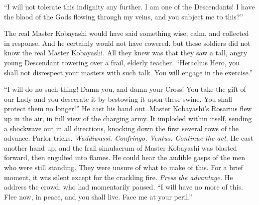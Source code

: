 “I will not tolerate this indignity any further. I am one of the Descendants! I have the blood of the Gods flowing through my veins, and you subject me to this?”

The real Master Kobayashi would have said something wise, calm, and collected in response. And he certainly would not have cowered. but these soldiers did not know the real Master Kobayashi. All they knew was that they saw a tall, angry young Descendant towering over a frail, elderly teacher.
\SmallVSpace
“Heraclius Hero, you shall not disrespect your masters with such talk. You will engage in the exercise.”

“I will do no such thing! Damn you, and damn your Cross! You take the gift of our Lady and you desecrate it by bestowing it upon these swine. You shall protect them no longer!”
\SmallVSpace
He cast his hand out. Master Kobayashi’s Rosarius flew up in the air, in full view of the charging army. It imploded within itself, sending a shockwave out in all directions, knocking down the first several rows of the advance. Parlor tricks. \emph{Waddiwassi. Confringo. Ventus.
\SmallVSpace
Continue the act.
\SmallVSpace}
He cast another hand up, and the frail simulacrum of Master Kobayashi was blasted forward, then engulfed into flames. He could hear the audible gasps of the men who were still standing. They were unsure of what to make of this. For a brief moment, it was silent except for the crackling fire.
\SmallVSpace
\emph{Press the advantage.}
\SmallVSpace
He address the crowd, who had momentarily paused. “I will have no more of this. Flee now, in peace, and you shall live. Face me at your peril.”

